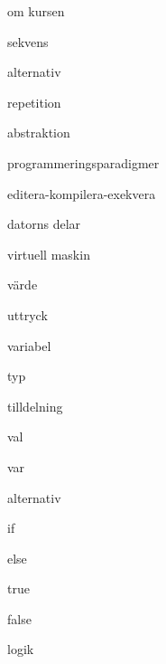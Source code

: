 \item om kursen
\item sekvens
\item alternativ
\item repetition
\item abstraktion
\item programmeringsparadigmer
\item editera-kompilera-exekvera
\item datorns delar
\item virtuell maskin
\item värde
\item uttryck
\item variabel
\item typ
\item tilldelning
\item val
\item var
\item alternativ
\item if
\item else
\item true
\item false
\item logik